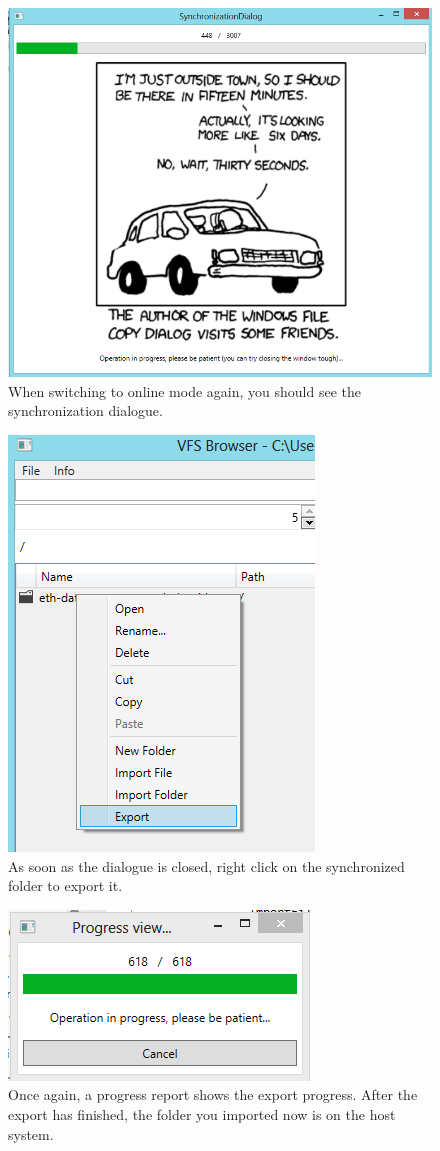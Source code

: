 \documentclass[JCDReport.tex]{subfiles}
\begin{document}
\begin{figure}[h!]
	\centering
	\includegraphics[scale=0.75]{Images/tutorial/14.png} 
	\caption{When switching to online mode again, you should see the synchronization dialogue.}
\end{figure}

\begin{figure}[h!]
	\centering
	\includegraphics[scale=1]{Images/tutorial/16.png} 
	\caption{As soon as the dialogue is closed, right click on the synchronized folder to export it.}
\end{figure}

\begin{figure}[h!]
	\centering
	\includegraphics[scale=1]{Images/tutorial/17.png} 
	\caption{Once again, a progress report shows the export progress. After the export has finished, the folder you imported now is on the host system.}
\end{figure}
\end{document}
